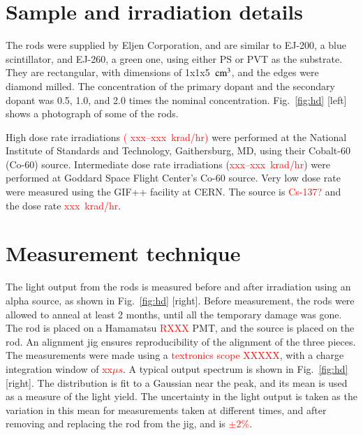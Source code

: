 \documentclass[review]{elsarticle}
\begin{document}
\section{Sample and irradiation details}
The rods were supplied by Eljen Corporation, and
are similar to EJ-200, a blue scintillator, and EJ-260, a green one, using either
PS or PVT as the substrate.
They are rectangular, with dimensions of 1x1x5~$\rm{cm^3}$, 
and the edges were diamond milled.
The concentration of the primary dopant and the secondary dopant
was 0.5, 1.0, and 2.0 times the nominal concentration.
Fig.~\ref{fig:hd} [left] shows a photograph of some of the rods.

High dose rate irradiations \textcolor{red}{( xxx--xxx~krad/hr)}
were performed at the National Institute of Standards and Technology, Gaithersburg, MD, using their Cobalt-60 (Co-60) source.  Intermediate dose rate irradiations (\textcolor{red}{xxx--xxx~krad/hr}) were performed at Goddard Space Flight Center's Co-60 source.  Very low dose rate were measured using the GIF++ facility\cite{gif} at CERN.  The source is \textcolor{red}{Cs-137?} and the dose rate \textcolor{red}{xxx~krad/hr}.

\section{Measurement technique}
The light output from the rods is measured before and after
irradiation using an alpha source, as shown in Fig.~\ref{fig:hd} [right].
Before measurement, the rods were allowed to anneal
at least 2 months,  until all the temporary damage was gone.
The rod is placed on a Hamamatsu \textcolor{red}{RXXX} PMT, and the
source is placed on the rod.  An alignment jig ensures reproducibility
of the alignment of the three pieces.  The measurements were made using
a \textcolor{red}{textronics scope XXXXX}, with a charge integration
window of \textcolor{red}{xx$\mu s$}.
A typical output spectrum is shown in Fig.~\ref{fig:hd} [right].
The distribution is fit to a Gaussian near the peak, and its mean is used as a measure of the light yield.  The uncertainty in the light output is taken as the variation in this mean for measurements taken at different times, and after removing and replacing the rod from the jig, and is
\textcolor{red}{$\pm 2$\%}.
\end{document}
